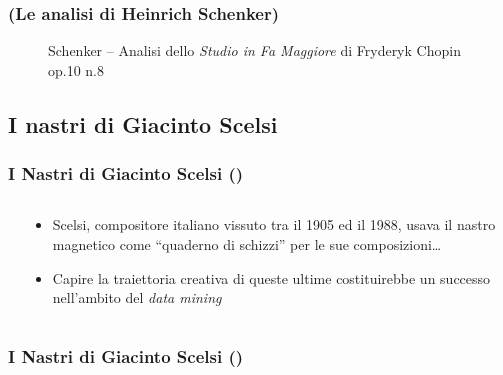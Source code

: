\documentclass[compress]{beamer}
\begin{document}
\begin{frame}
    \frametitle{(Le analisi di Heinrich Schenker)}

    \begin{center}
        \begin{figure}
            \caption{Schenker -- Analisi dello \emph{Studio in Fa Maggiore} di Fryderyk Chopin op.10 n.8}
        \end{figure}
    \end{center}

\end{frame}

\subsection[Scelsi]{I nastri di Giacinto Scelsi}

\setcounter{ms}{0}
\begin{frame}
    \frametitle{I Nastri di Giacinto Scelsi ()}
    
    \begin{columns}[T]
        \begin{column}{0.3\textwidth}
        \end{column}
        \begin{column}{0.7\textwidth}
            \begin{itemize}[<+- | alert@+->]
                \item Scelsi, compositore italiano vissuto tra il 1905 ed il
                    1988, usava il nastro magnetico come
                    ``quaderno di schizzi'' per le sue composizioni\dots
                \item Capire la traiettoria creativa di queste ultime
                    costituirebbe un successo nell'ambito del \emph{data
                    mining}
            \end{itemize}
        \end{column}
    \end{columns}

\end{frame}

\begin{frame}
    \frametitle{I Nastri di Giacinto Scelsi ()}
    
    \begin{center}
    \end{center}

\end{frame}
\end{document}

